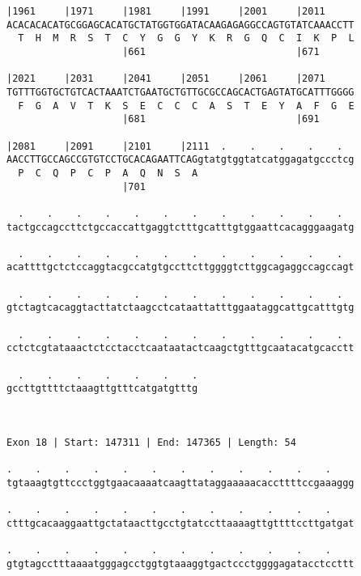 \documentclass{article}
\begin{document}
\begin{Verbatim}
|1961     |1971     |1981     |1991     |2001     |2011     
ACACACACATGCGGAGCACATGCTATGGTGGATACAAGAGAGGCCAGTGTATCAAACCTT
  T  H  M  R  S  T  C  Y  G  G  Y  K  R  G  Q  C  I  K  P  L
                    |661                          |671      
  
|2021     |2031     |2041     |2051     |2061     |2071     
TGTTTGGTGCTGTCACTAAATCTGAATGCTGTTGCGCCAGCACTGAGTATGCATTTGGGG
  F  G  A  V  T  K  S  E  C  C  C  A  S  T  E  Y  A  F  G  E
                    |681                          |691      
  
|2081     |2091     |2101     |2111  .    .    .    .    .  
AACCTTGCCAGCCGTGTCCTGCACAGAATTCAGgtatgtggtatcatggagatgccctcg
  P  C  Q  P  C  P  A  Q  N  S  A                           
                    |701                                    
  
  .    .    .    .    .    .    .    .    .    .    .    .  
tactgccagccttctgccaccattgaggtctttgcatttgtggaattcacagggaagatg
                                                            
  .    .    .    .    .    .    .    .    .    .    .    .  
acattttgctctccaggtacgccatgtgccttcttggggtcttggcagaggccagccagt
                                                            
  .    .    .    .    .    .    .    .    .    .    .    .  
gtctagtcacaggtacttatctaagcctcataattatttggaataggcattgcatttgtg
                                                            
  .    .    .    .    .    .    .    .    .    .    .    .  
cctctcgtataaactctcctacctcaataatactcaagctgtttgcaatacatgcacctt
                                                            
  .    .    .    .    .    .    .
gccttgttttctaaagttgtttcatgatgtttg
                                 
                                 
 
Exon 18 | Start: 147311 | End: 147365 | Length: 54
 
.    .    .    .    .    .    .    .    .    .    .    .    
tgtaaagtgttccctggtgaacaaaatcaagttataggaaaaacaccttttccgaaaggg
                                                            
.    .    .    .    .    .    .    .    .    .    .    .    
ctttgcacaaggaattgctataacttgcctgtatccttaaaagttgttttccttgatgat
                                                            
.    .    .    .    .    .    .    .    .    .    .    .    
gtgtagcctttaaaatgggagcctggtgtaaaggtgactccctggggagatacctccttt
                                                            

\end{Verbatim}
\end{document}
